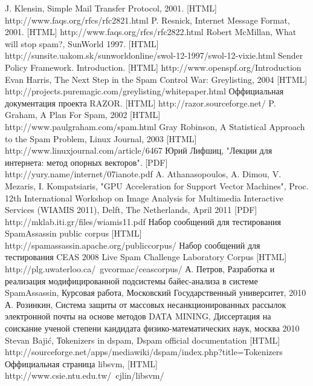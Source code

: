\newpage
\begin{thebibliography}{99}
 J. Klensin, Simple Mail Transfer Protocol, 2001. [HTML] http://www.faqs.org/rfcs/rfc2821.html 
 P. Resnick, Internet Message Format, 2001. [HTML] http://www.faqs.org/rfcs/rfc2822.html
 Robert McMillan, What will stop spam?, SunWorld 1997. [HTML] http://sunsite.uakom.sk/sunworldonline/swol-12-1997/swol-12-vixie.html
 Sender Policy Framework. Introduction.  [HTML] http://www.openspf.org/Introduction
 Evan Harris, The Next Step in the Spam Control War: Greylisting, 2004 [HTML] http://projects.puremagic.com/greylisting/whitepaper.html
 Оффициальная документация проекта RAZOR. [HTML] http://razor.sourceforge.net/
 P. Graham, A Plan For Spam, 2002 [HTML] http://www.paulgraham.com/spam.html
 Gray Robinson, A Statistical Approach to the Spam Problem, Linux Journal, 2003 [HTML] http://www.linuxjournal.com/article/6467 
 Юрий Лифшиц, "Лекции для интернета: метод опорных векторов". [PDF] http://yury.name/internet/07ianote.pdf
A. Athanasopoulos, A. Dimou, V. Mezaris, I. Kompatsiaris, "GPU Acceleration for Support Vector Machines", Proc. 12th International Workshop on Image Analysis for Multimedia Interactive Services (WIAMIS 2011), Delft, The Netherlands, April 2011 [PDF] http://mklab.iti.gr/files/wiamis11.pdf
 Набор сообщений для тестирования SpamAssassin public corpus [HTML] http://spamassassin.apache.org/publiccorpus/
 Набор сообщений для тестирования CEAS 2008 Live Spam Challenge Laboratory Corpus [HTML] http://plg.uwaterloo.ca/~gvcormac/ceascorpus/
 А. Петров, Разработка и реализация модифицированной подсистемы байес-анализа в системе SpamAssassin, Курсовая работа, Московский Государственный университет, 2010
 А. Розинкин, Система защиты от массовых несанкционированных рассылок электронной почты на основе методов DATA MINING, Диссертация на соискание ученой степени кандидата физико-математических наук, москва 2010 
 Stevan Bajić, Тоkenizers in dspam, Dspam official documentation [HTML] http://sourceforge.net/apps/mediawiki/dspam/index.php?title=Tokenizers
Оффициальная страница libsvm, [HTML] http://www.csie.ntu.edu.tw/~cjlin/libsvm/
\end{thebibliography}
